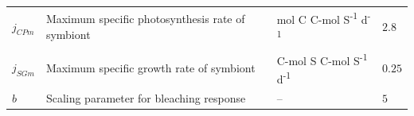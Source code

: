 \documentclass[]{elsarticle} %
\begin{document}
\begin{longtable}[c]{@{}llll@{}}
\begin{minipage}[t]{0.10\columnwidth}\raggedright\strut
\(j_{CPm}\)
\strut\end{minipage} &
\begin{minipage}[t]{0.45\columnwidth}\raggedright\strut
Maximum specific photosynthesis rate of symbiont
\strut\end{minipage} &
\begin{minipage}[t]{0.25\columnwidth}\raggedright\strut
mol C C-mol S\textsuperscript{-1} d\textsuperscript{-1}
\strut\end{minipage} &
\begin{minipage}[t]{0.12\columnwidth}\raggedright\strut
\(2.8\)
\strut\end{minipage}\tabularnewline
\begin{minipage}[t]{0.10\columnwidth}\raggedright\strut
\(j_{SGm}\)
\strut\end{minipage} &
\begin{minipage}[t]{0.45\columnwidth}\raggedright\strut
Maximum specific growth rate of symbiont
\strut\end{minipage} &
\begin{minipage}[t]{0.25\columnwidth}\raggedright\strut
C-mol S C-mol S\textsuperscript{-1} d\textsuperscript{-1}
\strut\end{minipage} &
\begin{minipage}[t]{0.12\columnwidth}\raggedright\strut
\(0.25\)
\strut\end{minipage}\tabularnewline
\begin{minipage}[t]{0.10\columnwidth}\raggedright\strut
\(b\)
\strut\end{minipage} &
\begin{minipage}[t]{0.45\columnwidth}\raggedright\strut
Scaling parameter for bleaching response
\strut\end{minipage} &
\begin{minipage}[t]{0.25\columnwidth}\raggedright\strut
--
\strut\end{minipage} &
\begin{minipage}[t]{0.12\columnwidth}\raggedright\strut
\(5\)
\strut\end{minipage}\tabularnewline
\bottomrule
\end{longtable}
\end{document}
